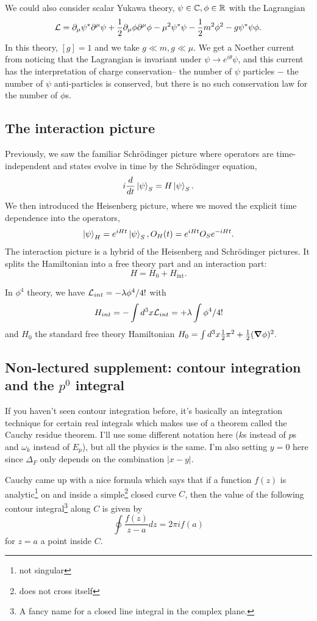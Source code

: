 \begin{exm}
We could also consider scalar Yukawa theory, $\psi\in \mathbb{C},\phi \in \mathbb{R}$ with the Lagrangian
$$\mathcal L=\partial_\mu \psi^* \partial^\mu \psi +\frac{1}{2}\partial_\mu \phi \partial^\mu \phi - \mu^2 \psi^*\psi -\frac{1}{2}m^2 \phi^2 - g\psi^* \psi \phi.$$
In this theory, $[g]=1$ and we take $g\ll m, g\ll \mu$. We get a Noether current from noticing that the Lagrangian is invariant under $\psi\to e^{i\theta}\psi$, and this current has the interpretation of charge conservation-- the number of $\psi$ particles $-$ the number of $\psi$ anti-particles is conserved, but there is no such conservation law for the number of $\phi$s.
\end{exm}

\subsection*{The interaction picture} Previously, we saw the familiar Schr\"odinger picture where operators are time-independent and states evolve in time by the Schr\"odinger equation,
$$i \frac{d}{dt}\left| \psi \right>_S=H\left| \psi \right>_S.$$
We then introduced the Heisenberg picture, where we moved the explicit time dependence into the operators,
$$\left| \psi \right>_H = e^{iHt}\left| \psi \right>_S, O_H(t)=e^{iHt} O_S e^{-iHt}.$$
The interaction picture is a hybrid of the Heisenberg and Schr\"odinger pictures. It splits the Hamiltonian into a free theory part and an interaction part:
$$H=H_0+H_{\text{int}}.$$
\begin{exm}
In $\phi^4$ theory, we have $\mathcal L_{int}=-\lambda \phi^4/4!$ with $$H_{int}=-\int d^3x \mathcal L_{int}=+\lambda \int \phi^4/4!$$
and $H_0$ the standard free theory Hamiltonian
$H_0=\int d^3x \frac{1}{2}\pi^2+\frac{1}{2}(\mbox{\boldmath$ \nabla $} \phi)^2.$
\end{exm}

\subsection*{Non-lectured supplement: contour integration and the $p^0$ integral}
If you haven't seen contour integration before, it's basically an integration technique for certain real integrals which makes use of a theorem called the Cauchy residue theorem. I'll use some different notation here ($k$s instead of $p$s and $\omega_k$ instead of $E_p$), but all the physics is the same. I'm also setting $y=0$ here since $\Delta_F$ only depends on the combination $|x-y|$.

Cauchy came up with a nice formula which says that if a function $f(z)$ is analytic\footnote{not singular} on and inside a simple\footnote{does not cross itself} closed curve $C$, then the value of the following contour integral\footnote{A fancy name for a closed line integral in the complex plane.} along $C$ is given by
$$\oint \frac{f(z)}{z-a}dz = 2\pi i f(a)$$
for $z=a$ a point inside $C$.

